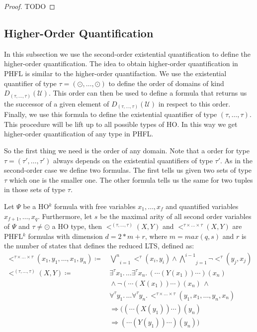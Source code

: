 \begin{proof}
    TODO
\end{proof}

\subsection{Higher-Order Quantification}\label{subsec:higher-orderQuantification}

In this subsection we use the second-order existential quantification to define the higher-order
quantification. The idea to obtain higher-order quantification in PHFL is similar to the higher-order quantifaction.
We use the existential quantifier of type $\tau = (\odot, \dots, \odot)$ to define the order of domains of kind
$D_{(\tau, \dots, \tau)}(\mathcal{U})$. This order can then be used to define a formula that returns us the successor
of a given element of $D_{(\tau, \dots, \tau)}(\mathcal{U})$ in respect to this order. Finally, we use this
formula to define the existential quantifier of type $(\tau, \dots, \tau)$. This procedure will be lift up to all
possible types of HO. In this way we get higher-order quantification of any type in PHFL.

So the first thing we need is the order of any domain. Note that a order for type $\tau = (\tau', \dots, \tau')$ always
depends on the existential quantifiers of type $\tau'$. As in the second-order case we define two formulas. The first
tells us given two sets of type $\tau$ which one is the smaller one. The other formula tells us the same for two
tuples in those sets of type $\tau$.

\begin{definition}
    \label{definition:lower_bound_less_higher}
    Let $\Psi$ be a HO$^k$ formula with free variables $x_1, \dots, x_f$ and quantified variables $x_{f+1}, \dots,
    x_q$. Furthermore, let $s$ be the maximal arity of all second order variables of $\Psi$ and $\tau \neq \odot$ a HO
    type, then $<^{(\tau, \dots, \tau)}(X, Y)$ and $<^{\tau \times \dots \times \tau}(X, Y)$ are PHFL$^k$ formulas
    with dimension $d = 2 * m + r$, where $m = max({q, s})$ and $r$ is the number of states that defines the reduced LTS, defined as:
    \begin{align*}
        <^{\tau \times \dots \times \tau}(x_1, y_1, \dots, x_1, y_n) \coloneqq &\,\underset{i =
        1}{\overset{n}{\bigvee}}<^{\tau}(x_i, y_i) \wedge \underset{j = 1}{\overset{i - 1}{\bigwedge}}
        \neg <^{\tau}(y_j, x_j)\\
        <^{(\tau, \dots, \tau)}(X, Y) \coloneqq &\,\exists^{\tau}x_1. \,\dots \exists^{\tau}x_n.\,(\dotsb(Y
        (x_1))\dotsb) (x_n)\\
        &\,\wedge \neg (\dotsb(X(x_1)) \dotsb)(x_n)\,\wedge \\&\,\forall^{\tau}y_1. \,\dots
        \forall^{\tau}y_n.\,<^{\tau \times \dots \times \tau}
        (y_1, x_1, \dots, y_n, x_n) \\&\,\Rightarrow ((\dotsb(X(y_1)) \dotsb)(y_n) \\&\,\Rightarrow (\dotsb(Y(y_1))
         \dotsb)(y_n))
    \end{align*}
\end{definition}


